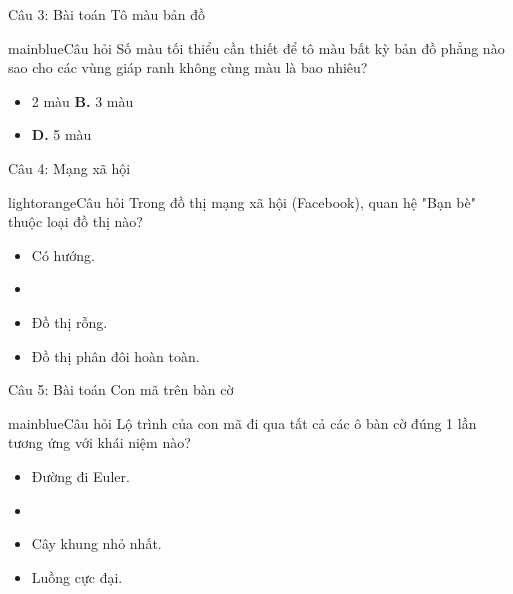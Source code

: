 \documentclass[10pt, xcolor={dvipsnames}]{beamer}
\begin{document}
\begin{frame}{Câu 3: Bài toán Tô màu bản đồ}
    \begin{gamebox}{mainblue}{Câu hỏi}
        Số màu tối thiểu cần thiết để tô màu bất kỳ bản đồ phẳng nào sao cho các vùng giáp ranh không cùng màu là bao nhiêu?
    \end{gamebox}
    \begin{itemize}
        \item[\textbf{A.}] 2 màu \quad \quad \quad \quad \textbf{B.} 3 màu
        \item[\textbf{C.}]  \quad \textbf{D.} 5 màu
    \end{itemize}
\end{frame}

\begin{frame}{Câu 4: Mạng xã hội}
    \begin{gamebox}{lightorange}{Câu hỏi}
        Trong đồ thị mạng xã hội (Facebook), quan hệ "Bạn bè" thuộc loại đồ thị nào?
    \end{gamebox}
    \begin{itemize}
        \item[\textbf{A.}] Có hướng.
        \item[\textbf{B.}] 
        \item[\textbf{C.}] Đồ thị rỗng.
        \item[\textbf{D.}] Đồ thị phân đôi hoàn toàn.
    \end{itemize}
\end{frame}

\begin{frame}{Câu 5: Bài toán Con mã trên bàn cờ}
    \begin{gamebox}{mainblue}{Câu hỏi}
        Lộ trình của con mã đi qua tất cả các ô bàn cờ đúng 1 lần tương ứng với khái niệm nào?
    \end{gamebox}
    \begin{itemize}
        \item[\textbf{A.}] Đường đi Euler.
        \item[\textbf{B.}] 
        \item[\textbf{C.}] Cây khung nhỏ nhất.
        \item[\textbf{D.}] Luồng cực đại.
    \end{itemize}
\end{frame}
\end{document}
